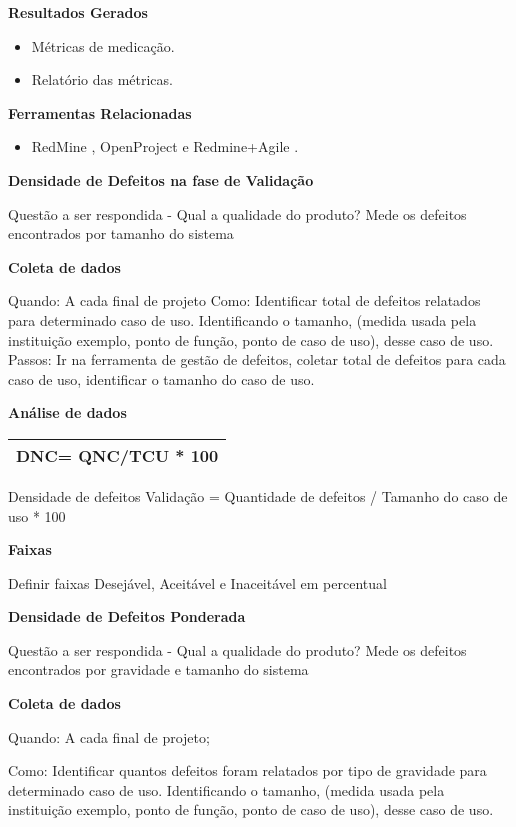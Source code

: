 \textbf{Resultados Gerados}
\begin{itemize}
    \item Métricas de medicação.
    \item Relatório das métricas.
\end{itemize}

\textbf{Ferramentas Relacionadas}
\begin{itemize}
    \item RedMine \cite{Redmine}, OpenProject \cite{OpenProject} e Redmine+Agile \cite{RedmineUP}.
\end{itemize}

\textbf{Densidade de Defeitos na fase de Validação}

Questão a ser respondida - Qual a qualidade do produto? Mede os defeitos encontrados por tamanho do sistema

\textbf{Coleta de dados}

Quando: A cada final de projeto Como: Identificar total de defeitos relatados para determinado caso de uso. Identificando o tamanho, (medida usada pela instituição exemplo, ponto de função, ponto de caso de uso), desse caso de uso. Passos: Ir na ferramenta de gestão de defeitos, coletar total de defeitos para cada caso de uso, identificar o tamanho do caso de uso.

\textbf{Análise de dados}

\begin{tabular}{|l|}
\hline
DNC= QNC/TCU * 100 \\ 
\hline
\end{tabular}

Densidade de defeitos Validação = Quantidade de defeitos / Tamanho do caso de uso * 100

\textbf{Faixas}

Definir faixas Desejável, Aceitável e Inaceitável em percentual

\textbf{Densidade de Defeitos Ponderada}

Questão a ser respondida - Qual a qualidade do produto? Mede os defeitos encontrados por gravidade e tamanho do sistema

\textbf{Coleta de dados}

Quando: A cada final de projeto;

Como: Identificar quantos defeitos foram relatados por tipo de gravidade para determinado caso de uso. Identificando o tamanho, (medida usada pela instituição exemplo, ponto de função, ponto de caso de uso), desse caso de uso. 

